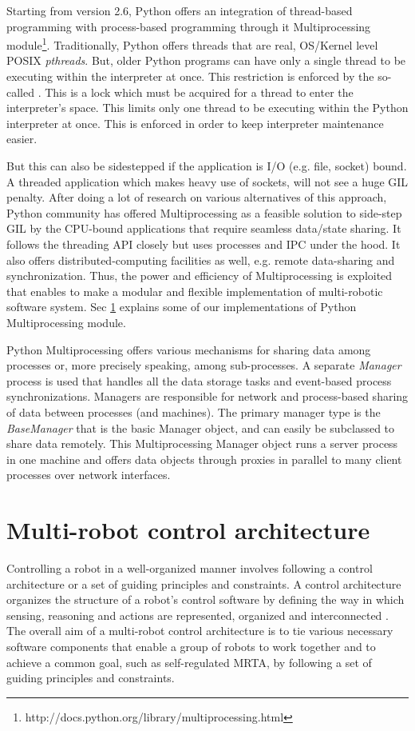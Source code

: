 Starting from version 2.6, Python offers an integration of thread-based programming with process-based programming through it Multiprocessing module\footnote{http://docs.python.org/library/multiprocessing.html}. Traditionally, Python offers threads that are real, OS/Kernel level POSIX {\em pthreads}.  But, older Python programs can have only a single thread to be executing within the interpreter at once. This restriction is enforced by the so-called . This is a lock which must be
 acquired for a thread to enter the interpreter's space.
 This limits only one thread to  be executing within the Python interpreter at once.  This is enforced  in order to keep interpreter maintenance easier.
 
But this can also be sidestepped if the application is I/O (e.g. file, socket) bound. A threaded application which makes heavy use of sockets, will not see a huge GIL penalty.  After  doing a lot of research on various alternatives of this approach, Python community has offered Multiprocessing as a feasible solution to side-step GIL by the CPU-bound applications that  require seamless data/state sharing.   It follows the threading API closely but uses processes and IPC under the hood. It also offers distributed-computing facilities as well, e.g. remote data-sharing and synchronization.  Thus, the power and efficiency of Multiprocessing is exploited that enables to make a modular and flexible implementation of multi-robotic software system. Sec \ref{expt-tools:arch} explains some of our implementations of Python Multiprocessing module.
 
Python Multiprocessing offers various mechanisms for sharing data among processes or, more precisely speaking, among sub-processes. A separate {\em Manager} process is used that handles all the data storage tasks and event-based process synchronizations.  Managers are responsible for network and process-based sharing of data between processes (and machines).
 The primary manager type is the {\em BaseManager} that is the basic Manager object, and can easily be subclassed to share
 data remotely.  This Multiprocessing Manager object runs a server process in one machine and offers data objects through proxies in parallel to many client  processes over network interfaces.
\section{Multi-robot control architecture}
\label{expt-tools:arch}
Controlling a robot in a well-organized manner involves following a control architecture or a set of guiding principles and constraints. A control architecture organizes the structure  of a robot's control software by defining the way in which sensing, reasoning and actions are represented, organized and interconnected \cite{Bekey2005}. The overall aim of a multi-robot control architecture is to tie various necessary software components that enable a group of robots to work together and to achieve a common goal, such as self-regulated MRTA, by following a set of guiding principles and constraints. 

